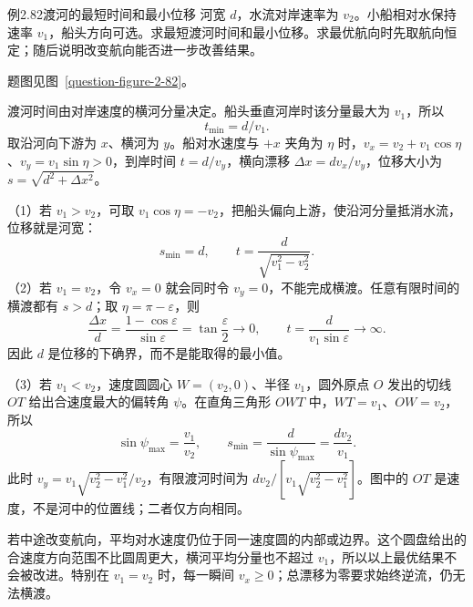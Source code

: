 \KinematicKeepSpace{11cm}
\begin{origexamplebox}{例2.82\quad 渡河的最短时间和最小位移}
河宽 $d$，水流对岸速率为 $v_2$。小船相对水保持速率 $v_1$，船头方向可选。求最短渡河时间和最小位移。求最优航向时先取航向恒定；随后说明改变航向能否进一步改善结果。
\par 题图见图~\ref{question-figure-2-82}。
\KQuestionDE
\end{origexamplebox}
\begin{xesolution}
渡河时间由对岸速度的横河分量决定。船头垂直河岸时该分量最大为 $v_1$，所以
\RiverCrossingDiagram
\[
\boxed{t_{\min}=d/v_1}.
\]
取沿河向下游为 $x$、横河为 $y$。船对水速度与 $+x$ 夹角为 $\eta$ 时，$v_x=v_2+v_1\cos\eta$、$v_y=v_1\sin\eta>0$，到岸时间 $t=d/v_y$，横向漂移 $\Delta x=dv_x/v_y$，位移大小为 $s=\sqrt{d^2+\Delta x^2}$。

（1）若 $v_1>v_2$，可取 $v_1\cos\eta=-v_2$，把船头偏向上游，使沿河分量抵消水流，位移就是河宽：
\[
\boxed{s_{\min}=d},\qquad
t=\frac{d}{\sqrt{v_1^2-v_2^2}}.
\]
（2）若 $v_1=v_2$，令 $v_x=0$ 就会同时令 $v_y=0$，不能完成横渡。任意有限时间的横渡都有 $s>d$；取 $\eta=\pi-\varepsilon$，则
\[
\frac{\Delta x}{d}=\frac{1-\cos\varepsilon}{\sin\varepsilon}
=\tan\frac\varepsilon2\longrightarrow0,
\qquad t=\frac{d}{v_1\sin\varepsilon}\longrightarrow\infty.
\]
因此 $d$ 是位移的下确界，而不是能取得的最小值。

（3）若 $v_1<v_2$，速度圆圆心 $W=(v_2,0)$、半径 $v_1$，圆外原点 $O$ 发出的切线 $OT$ 给出合速度最大的偏转角 $\psi$。在直角三角形 $OWT$ 中，$WT=v_1$、$OW=v_2$，所以
\[
\sin\psi_{\max}=\frac{v_1}{v_2},\qquad
\boxed{s_{\min}=\frac{d}{\sin\psi_{\max}}=\frac{dv_2}{v_1}}.
\]
此时 $v_y=v_1\sqrt{v_2^2-v_1^2}/v_2$，有限渡河时间为 $dv_2/[v_1\sqrt{v_2^2-v_1^2}]$。图中的 $OT$ 是速度，不是河中的位置线；二者仅方向相同。

若中途改变航向，平均对水速度仍位于同一速度圆的内部或边界。这个圆盘给出的合速度方向范围不比圆周更大，横河平均分量也不超过 $v_1$，所以以上最优结果不会被改进。特别在 $v_1=v_2$ 时，每一瞬间 $v_x\ge0$；总漂移为零要求始终逆流，仍无法横渡。
\end{xesolution}

